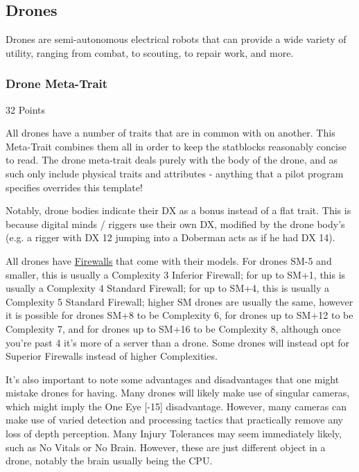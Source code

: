 \subsection{Drones}\label{drones}

Drones are semi-autonomous electrical robots that can provide a wide variety of utility, ranging from combat, to scouting, to repair work, and more.

\subsubsection{Drone Meta-Trait}
\begin{flushright}
	32 Points
\end{flushright}

All drones have a number of traits that are in common with on another. This Meta-Trait combines them all in order to keep the statblocks reasonably concise to read. The drone meta-trait deals purely with the body of the drone, and as such only include physical traits and attributes - anything that a pilot program specifies overrides this template!

Notably, drone bodies indicate their DX as a bonus instead of a flat trait. This is because digital minds / riggers use their own DX, modified by the drone body's (e.g. a rigger with DX 12 jumping into a Doberman acts as if he had DX 14).

All drones have \hyperref[firewall]{Firewalls} that come with their models. For drones SM-5 and smaller, this is usually a Complexity 3 Inferior Firewall; for up to SM+1, this is usually a Complexity 4 Standard Firewall; for up to SM+4, this is usually a Complexity 5 Standard Firewall; higher SM drones are usually the same, however it is possible for drones SM+8 to be Complexity 6, for drones up to SM+12 to be Complexity 7, and for drones up to SM+16 to be Complexity 8, although once you're past 4 it's more of a server than a drone. Some drones will instead opt for Superior Firewalls instead of higher Complexities.

It's also important to note some advantages and disadvantages that one might mistake drones for having. Many drones will likely make use of singular cameras, which might imply the One Eye [-15] disadvantage. However, many cameras can make use of varied detection and processing tactics that practically remove any loss of depth perception. Many Injury Tolerances may seem immediately likely, such as No Vitals or No Brain. However, these are just different object in a drone, notably the brain usually being the CPU.

